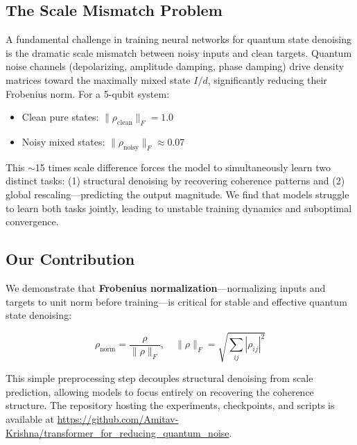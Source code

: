 \documentclass[11pt]{article}
\begin{document}
\subsection{The Scale Mismatch Problem}
\label{sec:org844d2ef}

A fundamental challenge in training neural networks for quantum state denoising is the dramatic scale mismatch between noisy inputs and clean targets. Quantum noise channels (depolarizing, amplitude damping, phase damping) drive density matrices toward the maximally mixed state \(I/d\), significantly reducing their Frobenius norm. For a 5-qubit system:
\begin{itemize}
\item Clean pure states: \(\|\rho_{\text{clean}}\|_F = 1.0\)
\item Noisy mixed states: \(\|\rho_{\text{noisy}}\|_F \approx 0.07\)
\end{itemize}

This \(\sim\)15 times scale difference forces the model to simultaneously learn two distinct tasks: (1) structural denoising by recovering coherence patterns and (2) global rescaling---predicting the output magnitude. We find that models struggle to learn both tasks jointly, leading to unstable training dynamics and suboptimal convergence.

\subsection{Our Contribution}
\label{sec:org3e886c7}

We demonstrate that \textbf{Frobenius normalization}---normalizing inputs and targets to unit norm before training---is critical for stable and effective quantum state denoising:

\begin{equation}
\rho_{\text{norm}} = \frac{\rho}{\|\rho\|_F}, \quad \|\rho\|_F = \sqrt{\sum_{ij} |\rho_{ij}|^2}
\end{equation}

This simple preprocessing step decouples structural denoising from scale prediction, allowing models to focus entirely on recovering the coherence structure. The repository hosting the experiments, checkpoints, and scripts is available at \url{https://github.com/Amitav-Krishna/transformer\_for\_reducing\_quantum\_noise}.
\end{document}
